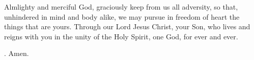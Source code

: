 \lettrine[lines=3]{A}{}lmlighty and merciful God, graciously keep from us all adversity, so that, unhindered in mind and body alike, we may pursue in freedom of heart the things that are yours. Through our Lord Jesus Christ, your Son, who lives and reigns with you in the unity of the Holy Spirit, one God, for ever and ever. \par \Rbar. Amen.   
